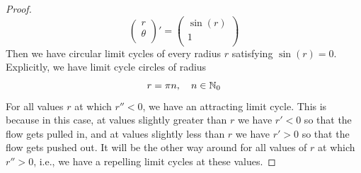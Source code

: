 \documentclass[../psets.tex]{subfiles}
\begin{document}
\begin{enumerate}
\begin{enumerate}
\begin{proof}
\begin{equation*}
{{\begin{pmatrix}
                            r\\
                            \theta\\
                        \end{pmatrix}'
                        =
                        \begin{pmatrix}
                            \sin(r)\\
                            1\\
                        \end{pmatrix}
                    }
                }
            \end{equation*}
            Then we have circular limit cycles of every radius $r$ satisfying $\sin(r)=0$. Explicitly, we have limit cycle circles of radius
            \begin{equation*}
                r = \pi n
                ,\quad
                n\in\mathbb{N}_0
            \end{equation*}
            For all values $r$ at which $r''<0$, we have an attracting limit cycle. This is because in this case, at values slightly greater than $r$ we have $r'<0$ so that the flow gets pulled in, and at values slightly less than $r$ we have $r'>0$ so that the flow gets pushed out. It will be the other way around for all values of $r$ at which $r''>0$, i.e., we have a repelling limit cycles at these values.
        \end{proof}
    \end{enumerate}
\end{enumerate}
\end{document}
